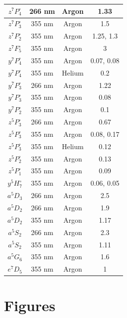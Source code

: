 \documentclass[12pt,twoside]{reedthesis}
\begin{document}
\begin{longtable}{||c|c|c|c||}
            $z^{7}P^{\circ}_{4}$ & 266 nm & Argon & 1.33 \\\hline
            $z^{7}P^{\circ}_{3}$ & 355 nm & Argon & 1.5 \\\hline
            $z^{7}P^{\circ}_{2}$ & 355 nm & Argon & 1.25, 1.3 \\\hline
            $z^{7}F^{\circ}_{5}$ & 355 nm & Argon & 3 \\\hline
            $y^{7}P^{\circ}_{4}$ & 355 nm & Argon & 0.07, 0.08 \\\hline
            $y^{7}P^{\circ}_{4}$ & 355 nm & Helium & 0.2 \\\hline
            $y^{7}P^{\circ}_{3}$ & 266 nm & Argon & 1.22 \\\hline
            $y^{7}P^{\circ}_{3}$ & 355 nm & Argon & 0.08 \\\hline
            $y^{7}P^{\circ}_{2}$ & 355 nm & Argon & 0.1 \\\hline
            $z^{5}P^{\circ}_{3}$ & 266 nm & Argon & 0.67 \\\hline
            $z^{5}P^{\circ}_{3}$ & 355 nm & Argon & 0.08, 0.17 \\\hline
            $z^{5}P^{\circ}_{3}$ & 355 nm & Helium & 0.12 \\\hline
            $z^{5}P^{\circ}_{2}$ & 355 nm & Argon & 0.13 \\\hline
            $z^{5}P^{\circ}_{1}$ & 355 nm & Argon & 0.09 \\\hline
            $y^{5}H^{\circ}_{7}$ & 355 nm & Argon & 0.06, 0.05 \\\hline
            $a^{5}D_{3}$ & 266 nm & Argon & 2.5 \\\hline
            $a^{5}D_{2}$ & 266 nm & Argon & 1.9 \\\hline
            $a^{5}D_{2}$ & 355 nm & Argon & 1.17 \\\hline
            $a^{5}S_{2}$ & 266 nm & Argon & 2.3 \\\hline
            $a^{5}S_{2}$ & 355 nm & Argon & 1.11 \\\hline
            $a^{5}G_{6}$ & 355 nm & Argon & 1.6 \\\hline
            $e^{7}D_{5}$ & 355 nm & Argon & 1 \\\hline

                \end{longtable}


   \section{Figures}
\end{document}
